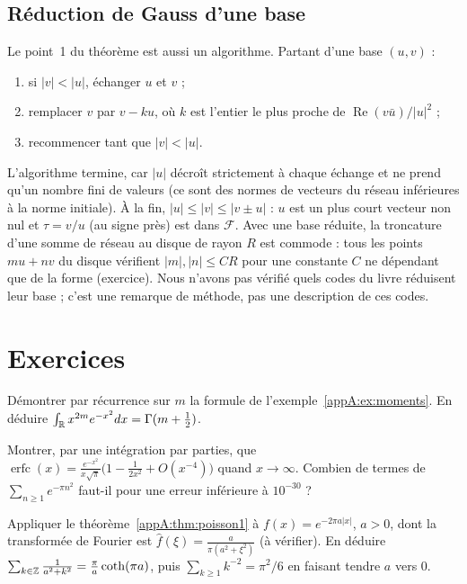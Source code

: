 \subsection{Réduction de Gauss d'une base}
Le point~1 du théorème est aussi un algorithme. Partant d'une base $(u,v)$ :
\begin{enumerate}
\item si $|v|<|u|$, échanger $u$ et $v$ ;
\item remplacer $v$ par $v-ku$, où $k$ est l'entier le plus proche de $\operatorname{Re}(v\bar u)/|u|^2$ ;
\item recommencer tant que $|v|<|u|$.
\end{enumerate}
L'algorithme termine, car $|u|$ décroît strictement à chaque échange et ne prend qu'un nombre fini de valeurs (ce sont
des normes de vecteurs du réseau inférieures à la norme initiale). À la fin, $|u|\le|v|\le|v\pm u|$ : $u$ est un plus
court vecteur non nul et $\tau=v/u$ (au signe près) est dans $\mathcal F$. Avec une base réduite, la troncature d'une somme de réseau au disque de rayon
$R$ est commode : tous les points $mu+nv$ du disque vérifient $|m|,|n|\le CR$ pour une constante $C$ ne dépendant que de
la forme (exercice). Nous n'avons pas vérifié quels codes du livre réduisent leur base ; c'est une remarque de méthode,
pas une description de ces codes.

\section{Exercices}\label{appA:sec:exos}

\begin{exercise}\label{appA:exo:moments}
Démontrer par récurrence sur $m$ la formule de l'exemple~\ref{appA:ex:moments}. En déduire
$\int_{\mathbb{R}} x^{2m}e^{-x^2}dx=\Gamma(m+\tfrac12)$.
\end{exercise}

\begin{exercise}\label{appA:ex:erfc}
Montrer, par une intégration par parties, que $\operatorname{erfc}(x)=\frac{e^{-x^2}}{x\sqrt\pi}\bigl(1-\frac1{2x^2}
+O(x^{-4})\bigr)$ quand $x\to\infty$. Combien de termes de $\sum_{n\ge1}e^{-\pi n^2}$ faut-il pour une erreur inférieure
à $10^{-30}$ ?
\end{exercise}

\begin{exercise}
Appliquer le théorème~\ref{appA:thm:poisson1} à $f(x)=e^{-2\pi a|x|}$, $a>0$, dont la transformée de Fourier est
$\hat f(\xi)=\frac{a}{\pi(a^2+\xi^2)}$ (à vérifier). En déduire $\sum_{k\in\mathbb{Z}}\frac1{a^2+k^2}=\frac\pi a\coth(\pi a)$,
puis $\sum_{k\ge1}k^{-2}=\pi^2/6$ en faisant tendre $a$ vers $0$.
\end{exercise}

